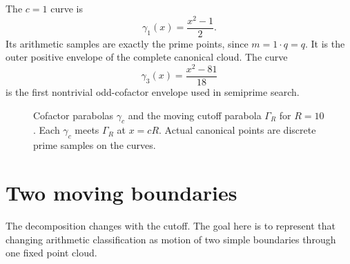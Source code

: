 \documentclass[11pt]{article}
\theoremstyle{definition}
\newcommand{\1}{\mathbf{1}}
\newcommand{\Repart}{\operatorname{Re}}
\newcommand{\Impart}{\operatorname{Im}}
\begin{document}
The $c=1$ curve is
\begin{equation}
 \gamma_1(x)=\frac{x^2-1}{2}.
 \label{eq:prime-curve}
\end{equation}
Its arithmetic samples are exactly the prime points, since $m=1\cdot q=q$.  It is the outer positive envelope of the complete canonical cloud.  The curve
\begin{equation}
 \gamma_3(x)=\frac{x^2-81}{18}
 \label{eq:three-curve}
\end{equation}
is the first nontrivial odd-cofactor envelope used in semiprime search.

\begin{figure}[htbp]
\centering
{}
\caption{Cofactor parabolas $\gamma_c$ and the moving cutoff parabola $\Gamma_R$ for $R=10$.  Each $\gamma_c$ meets $\Gamma_R$ at $x=cR$.  Actual canonical points are discrete prime samples on the curves.}
\label{fig:cofactor-parabolas}
\end{figure}


\section{Two moving boundaries}
\label{sec:moving-cutoff}

The decomposition changes with the cutoff.  The goal here is to represent that changing arithmetic classification as motion of two simple boundaries through one fixed point cloud.
\end{document}
